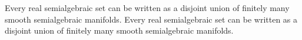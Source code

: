 Every real semialgebraic set can be written as a disjoint union of finitely many smooth semialgebraic manifolds.
Every real semialgebraic set can be written as a disjoint union of finitely many smooth semialgebraic manifolds.
